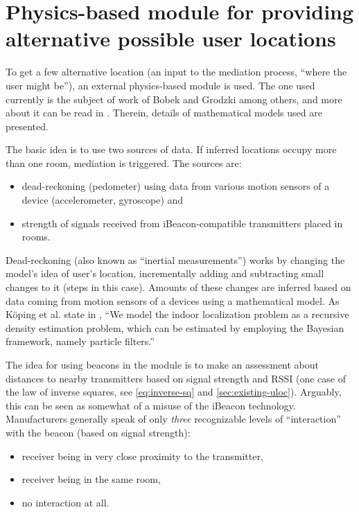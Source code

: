 \section{Physics-based module for providing alternative possible user locations}
\label{sec:physics-module}

To get a few alternative location (an input to the mediation process, ``where the user might be''), an external physics-based module is used. The one used currently is the subject of work of Bobek and Grodzki among others, and more about it can be read in \cite{bobek2015indoor, Koeping2015indoor}. Therein, details of mathematical models used are presented.

The basic idea is to use two sources of data. If inferred locations occupy more than one room, mediation is triggered. The sources are:

\begin{itemize}
	\item dead-reckoning (pedometer) using data from various motion sensors of a device (accelerometer, gyroscope) and
	\item strength of signals received from iBeacon-compatible transmitters placed in rooms.
\end{itemize}

Dead-reckoning (also known as ``inertial measurements'') works by changing the model's idea of user's location, incrementally adding and subtracting small changes to it (steps in this case). Amounts of these changes are inferred based on data coming from motion sensors of a devices using a mathematical model. As Köping et al. state in \cite{Koeping2015indoor}, ``We model the indoor localization problem as a recursive density estimation problem, which can be estimated by employing the Bayesian framework, namely particle filters.''

The idea for using beacons in the module is to make an assessment about distances to nearby transmitters based on signal strength and RSSI (one case of the law of inverse squares, see \cref{eq:inverse-sq} and \cref{sec:existing-uloc}). Arguably, this can be seen as somewhat of a misuse of the iBeacon technology. Manufacturers generally speak of only \emph{three} recognizable levels of ``interaction'' with the beacon (based on signal strength): \begin{itemize}
 	\item receiver being in very close proximity to the transmitter,
 	\item receiver being in the same room,
 	\item no interaction at all.
 \end{itemize}
 
